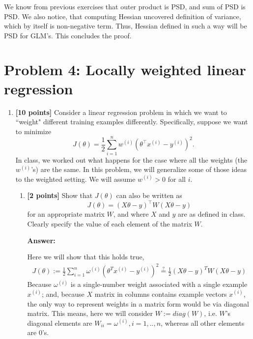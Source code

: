 \documentclass{article}
\begin{document}
\begin{enumerate}[label=\alph*)]
We know from previous exercises that outer product is PSD, and sum of PSD is PSD. We also notice, that computing Hessian uncovered definition of variance, which by itself is non-negative term. Thus, Hessian defined in such a way will be PSD for GLM's. This concludes the proof.
\end{enumerate}


\section*{Problem 4: Locally weighted linear regression}

\begin{enumerate}[label=\alph*)]
    \item \textbf{[10 points]} Consider a linear regression problem in which we want to ``weight" different training examples differently. Specifically, suppose we want to minimize
\[ J(\theta) = \frac{1}{2} \sum_{i=1}^{n} w^{(i)} (\theta^\top x^{(i)} - y^{(i)})^2. \]
In class, we worked out what happens for the case where all the weights (the $w^{(i)}$'s) are the same. In this problem, we will generalize some of those ideas to the weighted setting. We will assume $w^{(i)} > 0$ for all $i$.

    \begin{enumerate}[label=(\roman*.)]
        \item \textbf{[2 points]} Show that $J(\theta)$ can also be written as
\[ J(\theta) = (X\theta - y)^\top W (X\theta - y) \]
for an appropriate matrix $W$, and where $X$ and $y$ are as defined in class. Clearly specify the value of each element of the matrix $W$.

\textbf{Answer:}
        
        Here we will show that this holds true,
    \begin{align*}
        J(\theta):=\frac{1}{2}\sum_{i=1}^{n}\omega^{(i)} (\theta^Tx^{(i)}- y^{(i)})^{2} \stackrel{?}{=} \frac{1}{2}(X\theta - y)^T W(X\theta - y)
    \end{align*}
 Because $\omega^{(i)}$ is a single-number weight associated with a single example $x^{(i)}$; and, because $X$ matrix in columns contains example vectors $x^{(i)}$, the only way to represent weights in a matrix form would be via diagonal matrix. This means, here we will consider $W := diag(W)$, i.e. $W$'s diagonal elements are $W_{ii} =\omega^{(i)}, i=1,..,n$, whereas all other elements are 0's.


\end{enumerate}
\end{enumerate}
\end{document}
